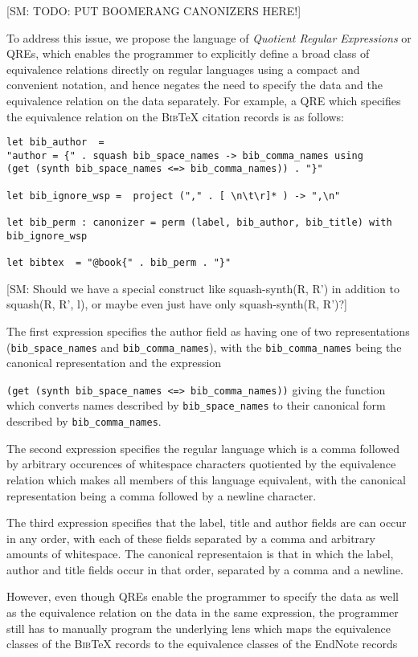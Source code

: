 \documentclass{svproc}
\newcommand{\FINISH}[3]{\ifdraft\textcolor{#1}{[#2: #3]}\fi}
\newcommand{\sam}[1]{\FINISH{dkpurple}{SM}{#1}}
\newcommand{\bibtex}{\textsc{Bib}\TeX{}}
\begin{document}
\sam{TODO: PUT BOOMERANG CANONIZERS HERE!}

To address this issue, we propose the language of {\em Quotient Regular
Expressions} or QREs, which enables the programmer to explicitly define a broad
class of equivalence relations directly on regular languages using a compact
and convenient notation, and hence negates the need to specify the data and the
equivalence relation on the data separately. For example, a QRE which
specifies the equivalence relation on the \bibtex{} citation records is as
follows:

\begin{verbatim}
let bib_author  = 
"author = {" . squash bib_space_names -> bib_comma_names using 
(get (synth bib_space_names <=> bib_comma_names)) . "}"

let bib_ignore_wsp =  project ("," . [ \n\t\r]* ) -> ",\n"

let bib_perm : canonizer = perm (label, bib_author, bib_title) with
bib_ignore_wsp

let bibtex  = "@book{" . bib_perm . "}"
\end{verbatim}

\sam{Should we have a special construct like squash-synth(R, R') in addition to
squash(R, R', l), or maybe even just have only squash-synth(R, R')?}

The first expression specifies the author field as
having one of two representations (\verb!bib_space_names! and
\verb!bib_comma_names!), with the \verb!bib_comma_names! being the
canonical representation and the expression 

\noindent \verb!(get (synth bib_space_names <=> bib_comma_names))! giving the
function which converts names described by \verb!bib_space_names! to their canonical
form described  by \verb!bib_comma_names!.

The second expression specifies the regular language which is a comma followed
by arbitrary occurences of whitespace characters quotiented by the equivalence
relation which makes all members of this language equivalent, with the canonical
representation being a comma followed by a newline character.

The third expression specifies that the label, title and author fields
are can occur in any order, with each of these fields separated by a comma and
arbitrary amounts of whitespace. The canonical representaion is that in which
the label, author and title fields occur in that order, separated by a comma and
a newline.

However, even though QREs enable the programmer to specify the data as well as
the equivalence relation on the data in the same expression, the programmer
still has to manually program the underlying lens which maps the equivalence
classes of the \bibtex{} records to the equivalence classes of the EndNote
records
\end{document}
